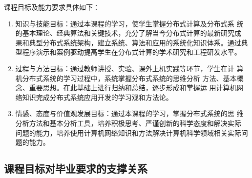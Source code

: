 \documentclass{swfusyllabus}
\begin{document}
课程目标及能力要求具体如下：
\begin{enumerate}
\item 知识与技能目标：通过本课程的学习，使学生掌握分布式计算及分布式系
  统的基本理论、经典算法和关键技术，充分了解当今分布式计算的最新研究成
  果和典型分布式系统架构，建立系统、算法和应用的系统化知识体系。通过典
  型程序演示和案例驱动提高学生在分布式计算的学术研究和工程研发水平。

\item 过程与方法目标：通过教师讲授、实验、课外上机实践等环节，学生在计
  算机分布式系统的学习过程中，系统掌握分布式系统的思维分析
  方法、基本概念、重要思想。在此基础上进行归纳和总结，逐步形成和掌握运
  用计算机网络知识完成分布式系统应用开发的学习观和方法论。
  
\item 情感、态度与价值观发展目标：通过本课程的学习，掌握分布式系统的思
  维分析方法和基本分析工具，培养积极思考、严谨创新的科学态度和解决实际
  问题的能力，培养使用计算机网络知识和方法解决计算机科学领域相关实际问
  题的能力。
\end{enumerate}

\subsection{课程目标对毕业要求的支撑关系}
\end{document}
